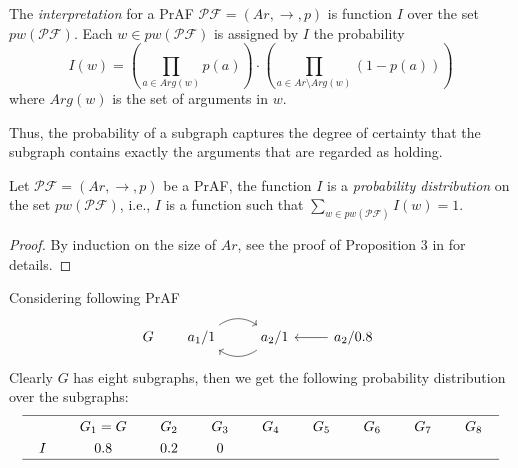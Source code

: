 \vspace{1.5em}




\begin{df}
    The \textit{interpretation} for a PrAF $\mathcal{PF}=(Ar,\to,p)$ is  function 
    $I$ over the set $pw(\mathcal{PF})$. 
    Each $w \in pw(\mathcal{PF})$ is assigned by $I$ the probability 
    \[
        I(w) = \left( \prod_{a\in Arg(w)} p(a) \right) 
        \cdot
        \left( \prod_{a \in Ar \setminus Arg(w)} (1 - p(a)) \right)
    \]
    where $Arg(w)$ is the set of arguments in $w$.
\end{df}


Thus, 
the probability of a subgraph captures the degree of certainty that the subgraph contains exactly the arguments that are regarded as holding.


\begin{thm}
    Let $\mathcal{PF}=(Ar,\to,p)$ be a PrAF, 
    the function $I$ is a \textit{probability distribution} on the set $pw(\mathcal{PF})$, 
    i.e., 
    $I$ is a function such that 
    $\sum_{w \in pw(\mathcal{PF})} I(w) = 1$.
\end{thm}
\begin{proof}
    By induction on the size of $Ar$, 
    see the proof of Proposition 3 in \cite[p.~60]{Hun2013} for details.
\end{proof}




\begin{example}
    Considering following PrAF 
    \[G \qquad 
    \begin{tikzcd}
        a_1/ 1 \arrow[r, bend left=35] & a_2 / 1 \arrow[l, bend left=35] & a_2 / 0.8 \arrow[l]
    \end{tikzcd}\]
    Clearly $G$ has eight subgraphs, 
    then we get the following probability distribution over the subgraphs:
    \[
      \renewcommand{\arraystretch}{1.3} %
      \renewcommand{\arraycolsep}{1.2em} %
    \begin{array}{ccccccccc}
        \hline 
        & G_1 = G & G_2 & G_3 & G_4 & G_5 & G_6 & G_7 & G_8 \\ 
        
        I 
        & 0.8 & 0.2 & 0  \\
        \hline
    \end{array}
    \]
\end{example}




